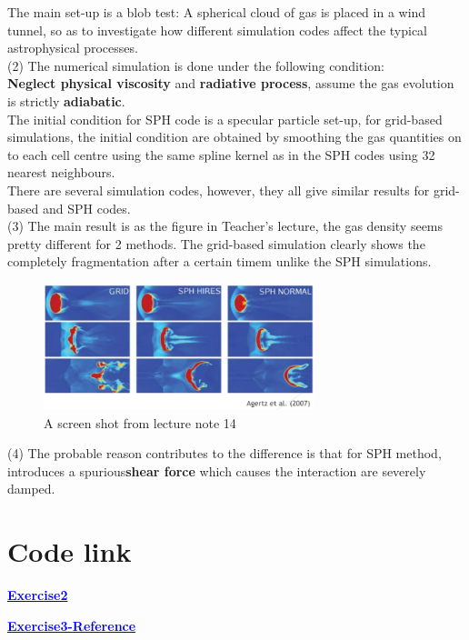 \documentclass[aps,12pt,prd,nofootinbib,bibnotes, amsmath,amssymb,showpacs,superscriptaddress,floatfix]{revtex4-2}
\begin{document}
The main set-up is a blob test: A spherical cloud of gas is placed in a wind tunnel, so as to investigate how different simulation codes affect the typical astrophysical processes. \\
   
(2) The numerical simulation is done under the following condition: \\
{\bf{Neglect physical viscosity}} and {\bf{radiative process}}, assume the gas evolution is strictly {\bf{adiabatic}}. \\  

 The initial condition for SPH code is a specular particle set-up, for grid-based simulations, the initial condition are obtained by smoothing the gas quantities on to each cell centre using the same spline kernel as in the SPH codes using 32 nearest neighbours.\\

There are several simulation codes, however, they all give similar results for grid-based and SPH codes.\\
 
(3) The main result is as the figure in Teacher's lecture, the gas density seems pretty different for 2 methods. The grid-based simulation clearly shows the completely fragmentation after a certain timem unlike the SPH simulations. 
\begin{figure}[H] 
\centering 
\includegraphics[width=0.7\textwidth]{EX3} 
\caption{A screen shot from lecture note 14}  
\end{figure}

(4) The probable reason contributes to the difference is that for SPH method, introduces a spurious{\bf{shear force}} which causes the interaction are severely damped.

\section{Code link}
\href{https://github.com/kuo1235/Computational-Astrophysics-2022/blob/main/astr660/Homework/HW6/EX2/laplace_template_L13\%20(1).ipynb}{\textcolor{blue}{\bf{Exercise2}}} 

\href{https://academic.oup.com/mnras/article/380/3/963/952655}{\textcolor{blue}{\bf{Exercise3-Reference}}}



\end{document}
